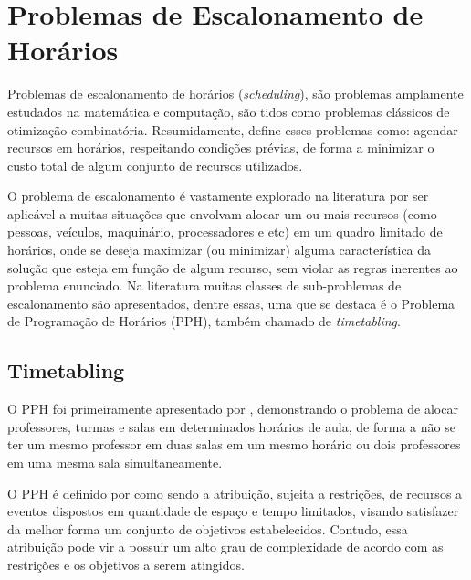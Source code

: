 \chapter{Problemas de Escalonamento de Horários}
\pagestyle{simple}
\label{cap:problema}

%
%
Problemas de escalonamento de horários (\textit{scheduling}), são problemas amplamente estudados na matemática e computação, são tidos como problemas clássicos de otimização combinatória. Resumidamente,  define esses problemas como: agendar recursos em horários, respeitando condições prévias, de forma a minimizar o custo total de algum conjunto de recursos utilizados. 

O problema de escalonamento é vastamente explorado na literatura por ser aplicável a muitas situações que envolvam alocar um ou mais recursos (como pessoas, veículos, maquinário, processadores e etc) em um quadro limitado de horários, onde se deseja maximizar (ou minimizar) alguma característica da solução que esteja em função de algum recurso, sem violar as regras inerentes ao problema enunciado. Na literatura muitas classes de sub-problemas de escalonamento são apresentados, dentre essas, uma que se destaca é o Problema de Programação de Horários (PPH), também chamado de \textit{timetabling}.


\section{Timetabling}

O PPH foi primeiramente apresentado por , demonstrando o problema de alocar professores, turmas e salas em determinados horários de aula, de forma a não se ter um mesmo professor em duas salas em um mesmo horário ou dois professores em uma mesma sala simultaneamente. 

O PPH é definido por  como sendo a atribuição, sujeita a restrições, de recursos a eventos dispostos em quantidade de espaço e tempo limitados, visando satisfazer da melhor forma um conjunto de objetivos estabelecidos. Contudo, essa atribuição pode vir a possuir um alto grau de complexidade de acordo com as restrições e os objetivos a serem atingidos. 

